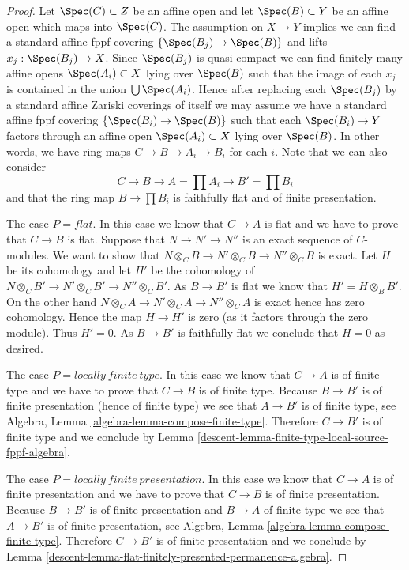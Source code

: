 \begin{proof}

Let $\Spec(C) \subset Z$ be an affine open and let
$\Spec(B) \subset Y$ be an affine open which maps into
$\Spec(C)$. The assumption on $X \to Y$ implies we can
find a standard affine fppf covering $\{\Spec(B_j) \to \Spec(B)\}$
and lifts $x_j : \Spec(B_j) \to X$. Since $\Spec(B_j)$
is quasi-compact we can find finitely many affine opens
$\Spec(A_i) \subset X$ lying over $\Spec(B)$
such that the image of each $x_j$
is contained in the union $\bigcup \Spec(A_i)$. Hence after
replacing each $\Spec(B_j)$ by a standard affine Zariski coverings
of itself we may assume we have a
standard affine fppf covering $\{\Spec(B_i) \to \Spec(B)\}$
such that each $\Spec(B_i) \to Y$ factors through an affine
open $\Spec(A_i) \subset X$ lying over $\Spec(B)$.
In other words, we have ring maps $C \to B \to A_i \to B_i$ for each $i$.
Note that we can also consider
$$
C \to B \to A = \prod A_i \to B' = \prod B_i
$$
and that the ring map $B \to \prod B_i$ is faithfully flat and
of finite presentation.

\medskip\noindent
The case $P = flat$. In this case we know that $C \to A$ is flat
and we have to prove that $C \to B$ is flat. Suppose that
$N \to N' \to N''$ is an exact sequence of $C$-modules. We want to
show that $N \otimes_C B \to N' \otimes_C B \to N'' \otimes_C B$
is exact. Let $H$ be its cohomology and let $H'$ be the cohomology
of $N \otimes_C B' \to N' \otimes_C B' \to N'' \otimes_C B'$. As
$B \to B'$ is flat we know that $H' = H \otimes_B B'$. On the other hand
$N \otimes_C A \to N' \otimes_C A \to N'' \otimes_C A$
is exact hence has zero cohomology. Hence the map
$H \to H'$ is zero (as it factors through the zero module).
Thus $H' = 0$. As $B \to B'$ is faithfully flat we conclude that
$H = 0$ as desired.

\medskip\noindent
The case $P = locally\ finite\ type$.
In this case we know that $C \to A$ is of finite type and
we have to prove that $C \to B$ is of finite type.
Because $B \to B'$ is of finite presentation (hence of finite type)
we see that $A \to B'$ is of finite type, see
Algebra, Lemma \ref{algebra-lemma-compose-finite-type}.
Therefore $C \to B'$ is of finite type and we conclude by
Lemma \ref{descent-lemma-finite-type-local-source-fppf-algebra}.

\medskip\noindent
The case $P = locally\ finite\ presentation$.
In this case we know that $C \to A$ is of finite presentation and
we have to prove that $C \to B$ is of finite presentation.
Because $B \to B'$ is of finite presentation and $B \to A$
of finite type we see that $A \to B'$ is of finite presentation, see
Algebra, Lemma \ref{algebra-lemma-compose-finite-type}.
Therefore $C \to B'$ is of finite presentation and we conclude by
Lemma \ref{descent-lemma-flat-finitely-presented-permanence-algebra}.
\end{proof}

